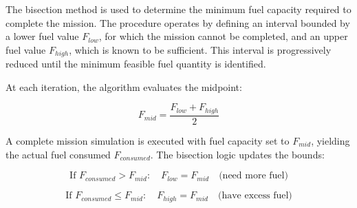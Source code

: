 The bisection method is used to determine the minimum fuel capacity required to complete the mission. The procedure operates by defining an interval bounded by a lower fuel value \(F_{low}\), for which the mission cannot be completed, and an upper fuel value \(F_{high}\), which is known to be sufficient. This interval is progressively reduced until the minimum feasible fuel quantity is identified.

At each iteration, the algorithm evaluates the midpoint:

\begin{equation}
F_{mid} = \frac{F_{low} + F_{high}}{2}
\end{equation}

A complete mission simulation is executed with fuel capacity set to $F_{mid}$, yielding the actual fuel consumed $F_{consumed}$. The bisection logic updates the bounds:

\begin{equation}
\text{If } F_{consumed} > F_{mid}: \quad F_{low} = F_{mid} \quad \text{(need more fuel)}
\end{equation}

\begin{equation}
\text{If } F_{consumed} \leq F_{mid}: \quad F_{high} = F_{mid} \quad \text{(have excess fuel)}
\end{equation}

